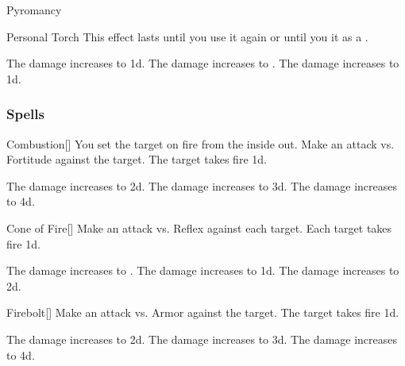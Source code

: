 \begin{spellsection}{Pyromancy}
\begin{freeability}{Personal Torch}
This effect lasts until you use it again or until you  it as a .

\rankline
{} The damage increases to  \minus1d.
 The damage increases to .
 The damage increases to  \plus1d.
\end{freeability}

\end{spellsection}


\subsubsection{Spells}


\lowercase{\hypertarget{spell:Combustion}{}}\label{spell:Combustion}
\begin{freeability}[Rank 1]{\hypertarget{spell:Combustion}{Combustion}}[]
You set the target on fire from the inside out.
Make an attack vs. Fortitude against the target.
\hit The target takes fire  \plus1d.

\rankline
{} The damage increases to  \plus2d.
 The damage increases to  \plus3d.
 The damage increases to  \plus4d.
\end{freeability}
\vspace{0.25em}



\lowercase{\hypertarget{spell:Cone of Fire}{}}\label{spell:Cone of Fire}
\begin{freeability}[Rank 1]{\hypertarget{spell:Cone of Fire}{Cone of Fire}}[]
Make an attack vs. Reflex against each target.
\hit Each target takes fire  \minus1d.

\rankline
{} The damage increases to .
 The damage increases to  \plus1d.
 The damage increases to  \plus2d.
\end{freeability}
\vspace{0.25em}



\lowercase{\hypertarget{spell:Firebolt}{}}\label{spell:Firebolt}
\begin{freeability}[Rank 1]{\hypertarget{spell:Firebolt}{Firebolt}}[]
Make an attack vs. Armor against the target.
\hit The target takes fire  \plus1d.

\rankline
{} The damage increases to  \plus2d.
 The damage increases to  \plus3d.
 The damage increases to  \plus4d.
\end{freeability}
\vspace{0.25em}



